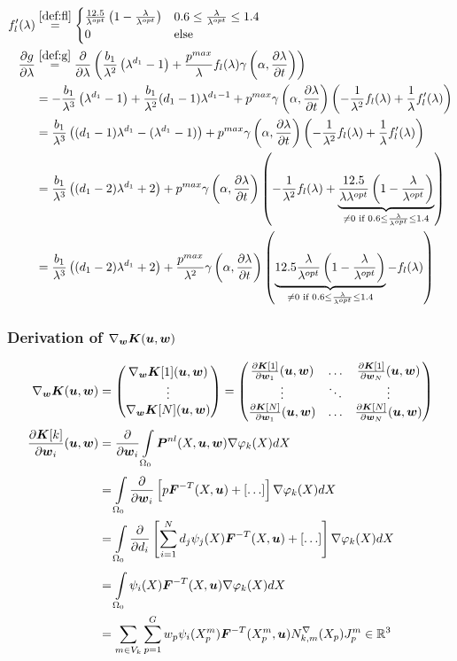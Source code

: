 \begin{align*}
	  f_l'(\lambda) &\re{def:fl} \begin{cases}
		\frac{12.5}{\lfo}\left(1-\frac{\la}{\lfo}\right) & 0.6 \leq \frac{\la}{\lfo} \leq 1.4\\ 
		0 & \text{else}
	\end{cases}\\	
	   \d{g}{\la} &\re{def:g} \d{}{\la}\left(\frac{b_1}{\la^2}\left(\la^{d_1} - 1\right)
		+\frac{p^{max}}{\la}f_l(\la)\gamma\left(\alpha,\d{\la}{t}\right)\right)\\
		&= -\frac{b_1}{\la^3}\left(\la^{d_1} - 1\right) + \frac{b_1}{\la^2}(d_1-1)\la^{d_1-1}
		+p^{max}\gamma\left(\alpha,\d{\la}{t}\right) \left(-\frac{1}{\la^2}f_l(\la) + \frac{1}{\la}f_l'(\la)\right)\\
		&= \frac{b_1}{\la^3}\left((d_1-1)\la^{d_1} - (\la^{d_1} - 1)\right)
		+p^{max}\gamma\left(\alpha,\d{\la}{t}\right) \left(-\frac{1}{\la^2}f_l(\la) + \frac{1}{\la}f_l'(\la)\right)\\
		&= \frac{b_1}{\la^3}\left((d_1-2)\la^{d_1} + 2\right)
		+p^{max}\gamma\left(\alpha,\d{\la}{t}\right) \left(-\frac{1}{\la^2}f_l(\la) 
		+ \underbrace{\frac{12.5}{\la\lfo}\left(1-\frac{\la}{\lfo}\right)}_{\neq 0\text{ if }0.6 \leq \frac{\la}{\lfo} \leq 1.4}\right)\\
		&= \frac{b_1}{\la^3}\left((d_1-2)\la^{d_1} + 2\right)
		+ \frac{p^{max}}{\la^2}\gamma\left(\alpha,\d{\la}{t}\right) \left( 
		\underbrace{12.5\frac{\la}{\lfo}\left(1-\frac{\la}{\lfo}\right)}_{\neq 0\text{ if }0.6 \leq \frac{\la}{\lfo} \leq 1.4}-f_l(\la)\right)
\end{align*}

\subsubsection{Derivation of $\nabla_{\boldsymbol{w}}\boldsymbol{K}(\boldsymbol{u},\boldsymbol{w})$}
\begin{align*}
	\nabla_{\boldsymbol{w}}\boldsymbol{K}(\boldsymbol{u},\boldsymbol{w}) &= \left(\begin{matrix}\nabla_{\boldsymbol{w}}\boldsymbol{K}[1](\boldsymbol{u},\boldsymbol{w})\\ \vdots \\ \nabla_{\boldsymbol{w}}\boldsymbol{K}[N](\boldsymbol{u},\boldsymbol{w})\end{matrix}\right)
	 = \left(\begin{matrix}\frac{\partial \boldsymbol{K}[1]}{\partial \boldsymbol{w}_1}(\boldsymbol{u},\boldsymbol{w}) & \ldots & \frac{\partial \boldsymbol{K}[1]}{\partial \boldsymbol{w}_N}(\boldsymbol{u},\boldsymbol{w})\\
	 	\vdots & \ddots & \vdots\\
	   \frac{\partial \boldsymbol{K}[N]}{\partial \boldsymbol{w}_1}(\boldsymbol{u},\boldsymbol{w}) & \ldots & \frac{\partial \boldsymbol{K}[N]}{\partial \boldsymbol{w}_N}(\boldsymbol{u},\boldsymbol{w})\end{matrix}\right)\\
	\frac{\partial \boldsymbol{K}[k]}{\partial \boldsymbol{w}_i}(\boldsymbol{u},\boldsymbol{w}) &= \frac{\partial }{\partial \boldsymbol{w}_i} \int\limits_{\Omega_0}^{}\boldsymbol{P}^{nl}(X,\boldsymbol{u},\boldsymbol{w})\nabla\varphi_{k}(X) dX\\
		&=  \int\limits_{\Omega_0}^{}\frac{\partial }{\partial \boldsymbol{w}_i} \left[p\boldsymbol{F}^{-T}(X,\boldsymbol{u}) +[\ldots] \right] \nabla\varphi_{k}(X) dX\\
		&=  \int\limits_{\Omega_0}^{}\frac{\partial }{\partial d_i} \left[\sum\limits_{i=1}^{N} d_j\psi_j(X)\boldsymbol{F}^{-T}(X,\boldsymbol{u}) +[\ldots] \right] \nabla\varphi_{k}(X) dX\\
		&=  \int\limits_{\Omega_0}^{} \psi_i(X)\boldsymbol{F}^{-T}(X,\boldsymbol{u})\nabla\varphi_{k}(X) dX\\
		&= \sum\limits_{m\in V_k}^{}\sum\limits_{p=1}^{G} w_p \psi_i(X^m_p)\boldsymbol{F}^{-T}(X^m_p,\boldsymbol{u}) N^\nabla_{k,m}(X_p)J^m_p\in\mathbb{R}^3
\end{align*}

